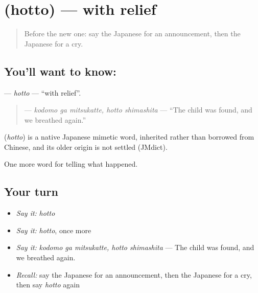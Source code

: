 \section[\texorpdfstring{\ja{ほっと} (hotto)}{ほっと (hotto)}]{ (hotto) — with relief}

\label{lesson:JA-C267-hotto}



\begin{quote}
Before the new one: say the Japanese for an announcement, then the Japanese for a cry.
\end{quote}

\subsection*{You'll want to know: }
\textbf{} — \emph{hotto} — \textquotedblleft{}with relief\textquotedblright{}.

\begin{quote}
\textbf{  } — \emph{kodomo ga mitsukatte, hotto shimashita} — \textquotedblleft{}The child was found, and we breathed again.\textquotedblright{}
\end{quote}

\begin{cousinweb}
\textbf{} (\emph{hotto}) is a native Japanese mimetic word, inherited rather than borrowed from Chinese, and its older origin is not settled (JMdict).
\end{cousinweb}

\begin{grammarlens}[title={What you've built}]
One more word for telling what happened.
\end{grammarlens}

\subsection*{Your turn}
\begin{itemize}
\raggedright
  \item \emph{Say it:} \emph{hotto}
  \item \emph{Say it:} \emph{hotto}, once more
  \item \emph{Say it:} \emph{kodomo ga mitsukatte, hotto shimashita} — The child was found, and we breathed again.
  \item \emph{Recall:} say the Japanese for an announcement, then the Japanese for a cry, then say \emph{hotto} again
\end{itemize}

